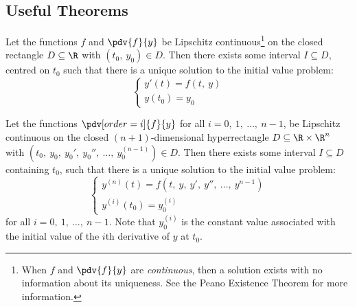 \documentclass{article}
\begin{document}
\subsection{Useful Theorems}
\begin{theorem}
    Let the functions \(f\) and \(\pdv{f}{y}\) be Lipschitz continuous\footnote{When \(f\) and \(\pdv{f}{y}\) are \emph{continuous}, then a solution exists with no information about its uniqueness. See the Peano Existence Theorem for more information.}
    on the closed rectangle \(D \subseteq \R\) with \(\left( t_0,\: y_0 \right) \in D\).
    Then there exists some interval \(I \subseteq D\), centred on \(t_0\) such that there is a unique solution to the initial value problem:
    \begin{equation*}
        \begin{cases}
            y'\left( t \right) = f\left( t,\: y \right) \\
            y\left( t_0 \right) = y_0
        \end{cases}
    \end{equation*}
\end{theorem}
\begin{corollary}
    Let the functions \(\pdv[order=i]{f}{y}\) for all \(i = 0,\: 1,\: \dots,\: n - 1\), be Lipschitz continuous
    on the closed \(\left( n+1 \right)\)-dimensional hyperrectangle \(D \subseteq \R \times \R^n\) with \(\left( t_0,\: y_0,\: y_0',\: y_0'',\: \dots,\: y_0^{\left( n-1 \right)} \right) \in D\).
    Then there exists some interval \(I \subseteq D\) containing \(t_0\), such that there is a unique solution to the initial value problem:
    \begin{equation*}
        \begin{cases}
            y^{\left( n \right)} \left( t \right) = f\left( t,\: y,\: y',\: y'',\: \dots,\: y^{n-1}  \right) \\
            y^{\left( i \right)}\left( t_0 \right) = y_0^{\left( i \right)}
        \end{cases}
    \end{equation*}
    for all \(i = 0,\: 1,\: \dots,\: n - 1\). Note that \(y_0^{\left( i \right)}\) is the constant value associated with the initial value of the \(i\)th derivative of \(y\) at \(t_0\).
\end{corollary}
\end{document}
